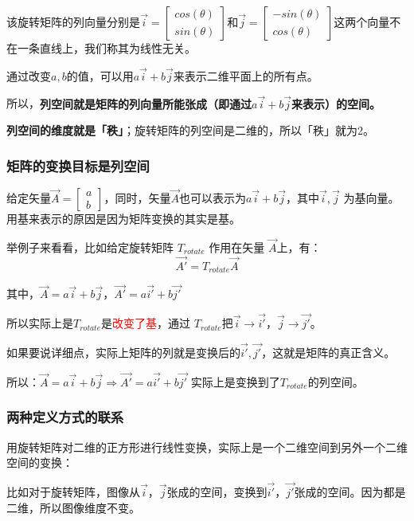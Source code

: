 \documentclass[12pt]{article}
\begin{document}
该旋转矩阵的列向量分别是$\vec{i}=\begin{bmatrix}cos(\theta)\\sin(\theta)\end{bmatrix}$和$\vec{j}=\begin{bmatrix}-sin(\theta)\\cos(\theta)\end{bmatrix}$这两个向量不在一条直线上，我们称其为线性无关。

通过改变$a,b$的值，可以用$a\vec{i} + b\vec{j}$来表示二维平面上的所有点。

所以，\textbf{列空间就是矩阵的列向量所能张成（即通过$a\vec{i} + b\vec{j}$来表示）的空间。}

\textbf{列空间的维度就是「秩」}；旋转矩阵的列空间是二维的，所以「秩」就为2。

\subsubsection{矩阵的变换目标是列空间}
给定矢量$\vec{A} = \begin{bmatrix}a\\b\end{bmatrix}$，同时，矢量$\vec{A}$也可以表示为$a\vec{i}+b\vec{j}$，其中$\vec{i},\vec{j}$ 为基向量。用基来表示的原因是因为矩阵变换的其实是基。

举例子来看看，比如给定旋转矩阵 $T_{rotate}$ 作用在矢量 $\vec{A}$上，有：
$$
\vec{A'} = T_{rotate}\vec{A}
$$

其中，$\vec{A} = a\vec{i} + b\vec{j}$，$\vec{A'} = a\vec{i'} + b\vec{j'}$

所以实际上是$T_{rotate}$是\textcolor{red}{改变了基}，通过 $T_{rotate}$把$\vec{i} \rightarrow \vec{i'}$，$\vec{j} \rightarrow \vec{j'}$。

如果要说详细点，实际上矩阵的列就是变换后的$\vec{i'},\vec{j'}$，这就是矩阵的真正含义。

所以：$\vec{A} = a\vec{i} + b\vec{j} \Rightarrow \vec{A'} = a\vec{i'} + b\vec{j'}$ 实际上是变换到了$T_{rotate}$的列空间。

\subsubsection{两种定义方式的联系}
用旋转矩阵对二维的正方形进行线性变换，实际上是一个二维空间到另外一个二维空间的变换：

比如对于旋转矩阵，图像从$\vec{i}$，$\vec{j}$张成的空间，变换到$\vec{i'}$，$\vec{j'}$张成的空间。因为都是二维，所以图像维度不变。
\end{document}
